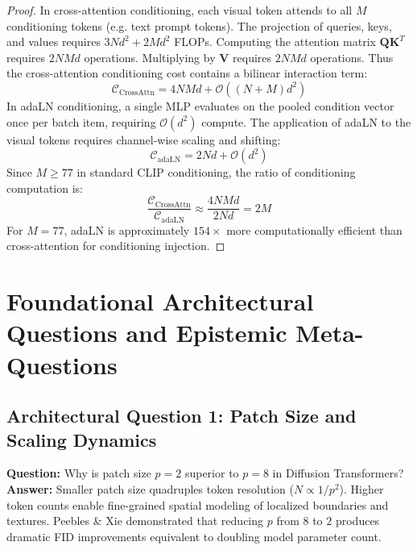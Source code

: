 \documentclass[11pt,a4paper]{article}
\theoremstyle{definition}
\begin{document}
\begin{proof}
In cross-attention conditioning, each visual token attends to all $M$ conditioning tokens (e.g. text prompt tokens).
The projection of queries, keys, and values requires $3 N d^2 + 2 M d^2$ FLOPs.
Computing the attention matrix $\mathbf{Q}\mathbf{K}^T$ requires $2 N M d$ operations.
Multiplying by $\mathbf{V}$ requires $2 N M d$ operations.
Thus the cross-attention conditioning cost contains a bilinear interaction term:
{\boldmath
\begin{equation}
\mathcal{C}_{\text{CrossAttn}} = 4 N M d + \mathcal{O}((N + M)d^2)
\end{equation}
}
In adaLN conditioning, a single MLP evaluates on the pooled condition vector once per batch item, requiring $\mathcal{O}(d^2)$ compute.
The application of adaLN to the visual tokens requires channel-wise scaling and shifting:
{\boldmath
\begin{equation}
\mathcal{C}_{\text{adaLN}} = 2 N d + \mathcal{O}(d^2)
\end{equation}
}
Since $M \ge 77$ in standard CLIP conditioning, the ratio of conditioning computation is:
{\boldmath
\begin{equation}
\frac{\mathcal{C}_{\text{CrossAttn}}}{\mathcal{C}_{\text{adaLN}}} \approx \frac{4 N M d}{2 N d} = 2M
\end{equation}
}
For $M = 77$, adaLN is approximately $154\times$ more computationally efficient than cross-attention for conditioning injection.
\end{proof}

\section{Foundational Architectural Questions and Epistemic Meta-Questions}

\subsection{Architectural Question 1: Patch Size and Scaling Dynamics}
\textbf{Question:} Why is patch size $p = 2$ superior to $p = 8$ in Diffusion Transformers?\\
\textbf{Answer:} Smaller patch size quadruples token resolution ($N \propto 1/p^2$). Higher token counts enable fine-grained spatial modeling of localized boundaries and textures. Peebles \& Xie demonstrated that reducing $p$ from $8$ to $2$ produces dramatic FID improvements equivalent to doubling model parameter count.
\end{document}
